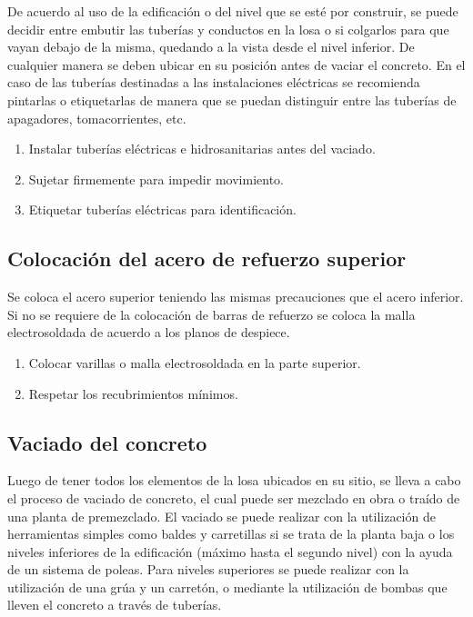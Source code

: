 \documentclass[12pt]{article}
\begin{document}
		De acuerdo al uso de la edificación o del nivel que se esté por construir, se puede
		decidir entre embutir las tuberías y conductos en la losa o si colgarlos para que
		vayan debajo de la misma, quedando a la vista desde el nivel inferior. De cualquier
		manera se deben ubicar en su posición antes de vaciar el concreto. En el caso de
		las tuberías destinadas a las instalaciones eléctricas se recomienda pintarlas o
		etiquetarlas de manera que se puedan distinguir entre las tuberías de apagadores,
		tomacorrientes, etc.
		
	\begin{enumerate}
		\item Instalar tuberías eléctricas e hidrosanitarias antes del vaciado.
		\item Sujetar firmemente para impedir movimiento.
		\item Etiquetar tuberías eléctricas para identificación.
	\end{enumerate}
	
	\subsection{Colocación del acero de refuerzo superior}
	Se coloca el acero superior teniendo las mismas precauciones que el acero
	inferior. Si no se requiere de la colocación de barras de refuerzo se coloca la malla
	electrosoldada de acuerdo a los planos de despiece.
	
	\begin{enumerate}
		\item Colocar varillas o malla electrosoldada en la parte superior.
		\item Respetar los recubrimientos mínimos.
	\end{enumerate}
	

	\subsection{Vaciado del concreto}
	Luego de tener todos los elementos de la losa ubicados en su sitio, se lleva a cabo
	el proceso de vaciado de concreto, el cual puede ser mezclado en obra o traído de
	una planta de premezclado.
	El vaciado se puede realizar con la utilización de herramientas simples como
	baldes y carretillas si se trata de la planta baja o los niveles inferiores de la
	edificación (máximo hasta el segundo nivel) con la ayuda de un sistema de poleas.
	Para niveles superiores se puede realizar con la utilización de una grúa y un
	carretón, o mediante la utilización de bombas que lleven el concreto a través de
	tuberías.
	
\end{document}
